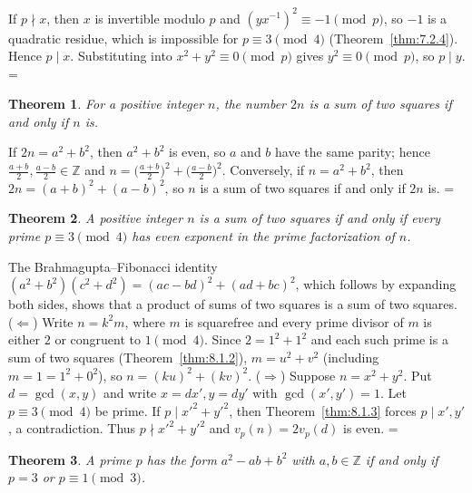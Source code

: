 \documentclass[11pt]{article}
\makeatletter
\theoremstyle{ntstyle}
\newtheorem{theorem}{Theorem}[subsection]
\let\nt@closedisplay\]
\def\nt@guardedclose{\@ifnextchar\par{\nt@closeafterpar}{\@ifnextchar\end{\postdisplaypenalty\@M\nt@closedisplay}{\nt@closedisplay}}}
\def\nt@closeafterpar\par{\@ifnextchar\par{\nt@closeafterpar}{\@ifnextchar\end{\postdisplaypenalty\@M\nt@closedisplay\par}{\nt@closedisplay\par}}}
\renewenvironment{proof}[1][\proofname]{\par
  \pushQED{\qed}\normalfont\topsep\medskipamount\edef\nt@afterproof{\@endparpenalty=\the\@endparpenalty\relax}\@beginparpenalty\@M\@endparpenalty\@M\let\]\nt@guardedclose\trivlist\item[]\textit{#1\@addpunct{.}} \ignorespaces}{\ifvmode\addpenalty\@M\fi\popQED\nt@afterproof\endtrivlist\@endpefalse}
\makeatother
\begin{document}
\begin{proof} If $p \nmid x$, then $x$ is invertible
	modulo $p$ and $(y x^{-1})^2 \equiv -1 \pmod{p}$, so $-1$ is a
	quadratic residue, which is impossible for $p \equiv 3 \pmod{4}$ (Theorem~\ref{thm:7.2.4}).
	Hence $p \mid x$. Substituting into $x^2+y^2\equiv0\pmod{p}$ gives
	$y^2\equiv0\pmod{p}$, so $p\mid y$.
\end{proof}
\begin{theorem}\label{thm:8.1.4} For a positive
	integer $n$, the number $2n$ is a sum of two squares if and only if $n$ is.
\end{theorem}

\begin{proof} If $2n = a^{2} + b^{2}$, then $a^{2} +
		b^{2}$ is even, so $a$ and $b$ have the same parity; hence
	$\tfrac{a+b}{2}, \tfrac{a-b}{2} \in \mathbb{Z}$ and $n =
		\big(\tfrac{a+b}{2}\big)^{2} + \big(\tfrac{a-b}{2}\big)^{2}$.
	Conversely, if $n = a^{2} + b^{2}$, then $2n = (a+b)^{2} + (a-b)^{2}$,
	so $n$ is a sum of two squares if and only if $2n$ is.
\end{proof}
\begin{theorem}\label{thm:8.1.5} A positive
	integer $n$ is a sum of two squares if and only if every prime $p
		\equiv 3 \pmod{4}$ has even exponent in the prime factorization of $n$.
\end{theorem}

\begin{proof} The Brahmagupta--Fibonacci identity $(a^2 +
		b^2)(c^2 + d^2) = (ac - bd)^2 + (ad + bc)^2$, which follows by expanding both sides, shows that a product of sums
	of two squares is a sum of two squares. ($\Leftarrow$) Write $n=k^2m$, where $m$ is squarefree and every prime divisor
	of $m$ is either $2$ or congruent to $1\pmod{4}$. Since $2
		= 1^2 + 1^2$ and each such prime is a sum of two squares (Theorem~\ref{thm:8.1.2}), $m = u^2 +
		v^2$ (including $m=1=1^2+0^2$), so $n = (ku)^2 + (kv)^2$. ($\Rightarrow$) Suppose
	$n = x^2 + y^2$. Put $d = \gcd(x, y)$ and write $x = dx', y = dy'$ with $\gcd(x', y') = 1$. Let $p
	\equiv 3 \pmod{4}$ be prime. If $p \mid x'^2 + y'^2$, then Theorem~\ref{thm:8.1.3} forces $p \mid
	x', y'$, a contradiction. Thus $p \nmid x'^2 + y'^2$
	and $v_p(n) = 2v_p(d)$ is even.\qedhere
\end{proof}
\begin{theorem}\label{thm:8.1.6} A
	prime $p$ has the form $a^2 - ab + b^2$ with $a, b \in \mathbb{Z}$ if
	and only if $p = 3$ or $p \equiv 1 \pmod{3}$.
\end{theorem}
\end{document}
